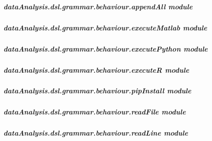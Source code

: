 \documentclass[letterpaper,10pt,english]{sphinxmanual}
\begin{document}
\subparagraph{dataAnalysis.dsl.grammar.behaviour.appendAll module}
\label{dataAnalysis.dsl.grammar.behaviour:dataanalysis-dsl-grammar-behaviour-appendall-module}

\subparagraph{dataAnalysis.dsl.grammar.behaviour.executeMatlab module}
\label{dataAnalysis.dsl.grammar.behaviour:dataanalysis-dsl-grammar-behaviour-executematlab-module}

\subparagraph{dataAnalysis.dsl.grammar.behaviour.executePython module}
\label{dataAnalysis.dsl.grammar.behaviour:dataanalysis-dsl-grammar-behaviour-executepython-module}

\subparagraph{dataAnalysis.dsl.grammar.behaviour.executeR module}
\label{dataAnalysis.dsl.grammar.behaviour:dataanalysis-dsl-grammar-behaviour-executer-module}

\subparagraph{dataAnalysis.dsl.grammar.behaviour.pipInstall module}
\label{dataAnalysis.dsl.grammar.behaviour:dataanalysis-dsl-grammar-behaviour-pipinstall-module}

\subparagraph{dataAnalysis.dsl.grammar.behaviour.readFile module}
\label{dataAnalysis.dsl.grammar.behaviour:dataanalysis-dsl-grammar-behaviour-readfile-module}\label{dataAnalysis.dsl.grammar.behaviour:module-dataAnalysis.dsl.grammar.behaviour.readFile}

\begin{fulllineitems}
\label{dataAnalysis.dsl.grammar.behaviour:dataAnalysis.dsl.grammar.behaviour.readFile.readFile}
\end{fulllineitems}



\subparagraph{dataAnalysis.dsl.grammar.behaviour.readLine module}
\label{dataAnalysis.dsl.grammar.behaviour:module-dataAnalysis.dsl.grammar.behaviour.readLine}\label{dataAnalysis.dsl.grammar.behaviour:dataanalysis-dsl-grammar-behaviour-readline-module}

\begin{fulllineitems}
\label{dataAnalysis.dsl.grammar.behaviour:dataAnalysis.dsl.grammar.behaviour.readLine.readLine}
\end{fulllineitems}
\end{document}

